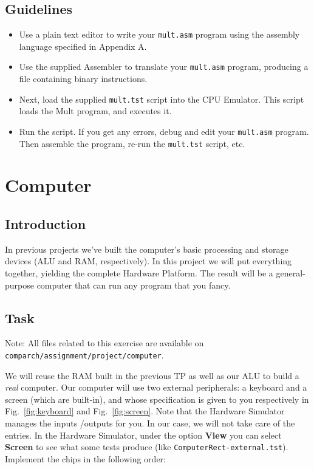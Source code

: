 \documentclass[11pt]{article}
\begin{document}
\subsection*{Guidelines}
\begin{itemize}
	\item Use a plain text editor to write your \texttt{mult.asm}  program using the assembly language specified in Appendix A.
	\item Use the supplied Assembler to translate your \texttt{mult.asm} program, producing a file containing binary instructions.
	\item Next, load the supplied \texttt{mult.tst} script into the CPU Emulator. This script loads the Mult program, and executes it.
	\item Run the script. If you get any errors, debug and edit your \texttt{mult.asm} program. Then assemble the program, re-run the \texttt{mult.tst} script, etc.
\end{itemize}


\section{Computer}
\label{sec:computer}
\subsection{Introduction}
In previous projects we’ve built the computer’s basic processing and storage devices (ALU and
RAM, respectively). In this project we will put everything together, yielding the complete 
Hardware Platform. The result will be a general-purpose computer that can run any program that
you fancy.

\subsection{Task}

Note: All files related to this exercise are available on \texttt{comparch/assignment/project/computer}.

We will reuse the RAM built in the previous TP as well as our ALU to build a \textit{real} computer. Our computer will use two external peripherals: a keyboard and a screen (which are built-in), and whose specification is given to you respectively in Fig.~\ref{fig:keyboard} and Fig.~\ref{fig:screen}. Note that the Hardware Simulator manages the inputs /outputs for you. In our case, we will not take care of the entries. In the Hardware Simulator, under the option \textbf{View} you can select \textbf{Screen} to see what some tests produce (like \texttt{ComputerRect-external.tst}). Implement the chips in the following order:
\end{document}
